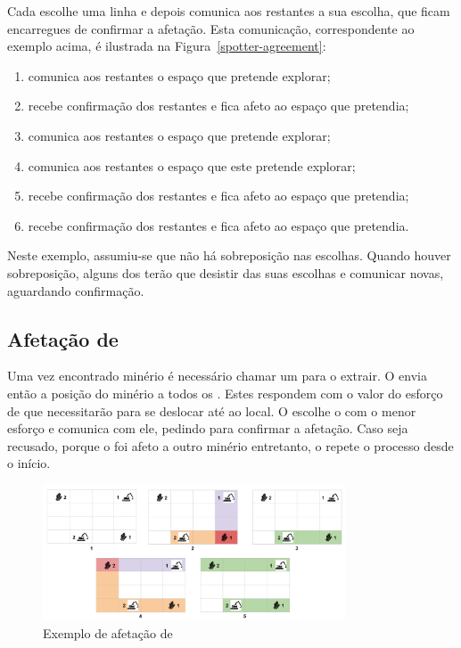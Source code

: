 \documentclass[12pt]{report}
\begin{document}
Cada \spotter escolhe uma linha e depois comunica aos restantes a sua escolha, que ficam encarregues de confirmar a afetação. Esta comunicação, correspondente ao exemplo acima, é ilustrada na Figura~\ref{spotter-agreement}:
\begin{enumerate}
	\item {} comunica aos restantes o espaço que pretende explorar;
    \item {} recebe confirmação dos restantes e fica afeto ao espaço que pretendia;
    \item {} comunica aos restantes o espaço que pretende explorar;
    \item {} comunica aos restantes o espaço que este pretende explorar;
    \item {} recebe confirmação dos restantes e fica afeto ao espaço que pretendia;
    \item {} recebe confirmação dos restantes e fica afeto ao espaço que pretendia.
\end{enumerate}

Neste exemplo, assumiu-se que não há sobreposição nas escolhas. Quando houver sobreposição, alguns dos \spotters terão que desistir das suas escolhas e comunicar novas, aguardando confirmação.

\FloatBarrier
\subsection{Afetação de \producers}
Uma vez encontrado minério é necessário chamar um \producer para o extrair. O \spotter envia então a posição do  minério a todos os \producers. 
Estes respondem com o valor do esforço de que necessitarão para se deslocar até ao local. 
O \spotter escolhe o \producer com o menor esforço e comunica com ele, pedindo para confirmar a afetação. 
Caso seja recusado, porque o \producer foi afeto a outro minério entretanto, o \spotter repete o processo desde o início.

\begin{figure}[h]
	\centering
    \includegraphics[width=0.8\textwidth]{producer-scheduling}
	\caption{Exemplo de afetação de \producers}
	\label{producer-scheduling}
\end{figure}
\end{document}
